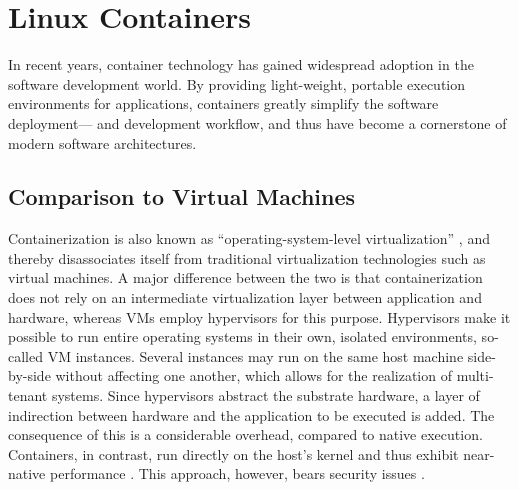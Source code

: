 
\section{Linux Containers}
In recent years, container technology has gained widespread adoption in the software development world. By providing light-weight, portable execution environments for applications, containers greatly simplify the software deployment— and development workflow, and thus have become a cornerstone of modern software architectures.

\subsection{Comparison to Virtual Machines}
Containerization is also known as ``operating-system-level virtualization'' \cite{soltesz2007container}, and thereby disassociates itself from traditional virtualization technologies such as virtual machines. A major difference between the two is that containerization does not rely on an intermediate virtualization layer between application and hardware, whereas VMs employ hypervisors for this purpose. Hypervisors make it possible to run entire operating systems in their own, isolated environments, so-called VM instances. Several instances may run on the same host machine side-by-side without affecting one another, which allows for the realization of multi-tenant systems. Since hypervisors abstract the substrate hardware, a layer of indirection between hardware and the application to be executed is added. The consequence of this is a considerable overhead, compared to native execution. Containers, in contrast, run directly on the host's kernel and thus exhibit near-native performance \cite{adufu2015container, felter2015updated, morabito2015hypervisors}. This approach, however, bears security issues \cite{xavier2013performance}.

